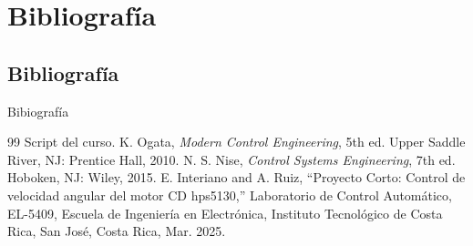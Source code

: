 \documentclass[mathserif,spanish]{beamer}
\begin{document}
\section{Bibliografía}              %
    \subsection{Bibliografía}       %
        \begin{frame}{Bibiografía}
            \footnotesize{
                \begin{thebibliography}{99} 
                \justifying
                Script del curso.
                K. Ogata, \textit{Modern Control Engineering}, 5th ed. Upper Saddle River, NJ: Prentice Hall, 2010.
                N. S. Nise, \textit{Control Systems Engineering}, 7th ed. Hoboken, NJ: Wiley, 2015.
                E. Interiano and A. Ruiz, ``Proyecto Corto: Control de velocidad angular del motor CD hps5130,'' Laboratorio de Control Automático, EL-5409, Escuela de Ingeniería en Electrónica, Instituto Tecnológico de Costa Rica, San José, Costa Rica, Mar. 2025.
                \end{thebibliography}
                }
        \end{frame}          
\end{document}
